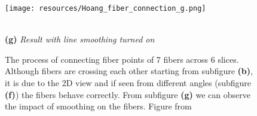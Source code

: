 \documentclass[english, bc, kiv, he, iso690alph, pdf, viewonly]{fasthesis}
\begin{document}
\begin{figure}[h!]
	\vspace{0.5cm} %
	\begin{minipage}[b]{0.4\textwidth}
		\centering
		\texttt{[image: resources/Hoang\_fiber\_connection\_g.png]}
    \end{minipage}
	\\
	\textbf{(g)} \textit{Result with line smoothing turned on}
	\caption{The process of connecting fiber points of 7 fibers across 6 slices. Although fibers are crossing each other starting from subfigure \textbf{(b)}, it is due to the 2D view and if seen from different angles (subfigure \textbf{(f)}) the fibers behave correctly. From subfigure \textbf{(g)} we can observe the impact of smoothing on the fibers. Figure from \cite{HOA23}}
	\label{fig:Hoang_fiber_connection}
\end{figure}

%
%
%
%


%
%
%
%
\backmatter
\printbibliography
\listoffigures
\listoftables
\listoflistings
%
%
\setbackpageqrcode
\backpage
\end{document}
